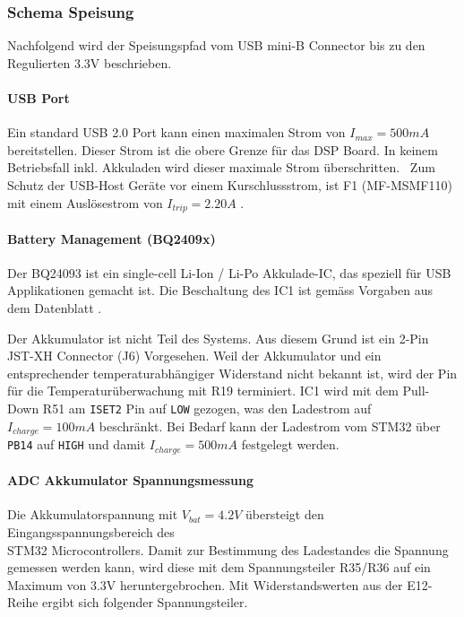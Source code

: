\subsubsection{Schema Speisung}
\label{sec:Schema_Speisung}

Nachfolgend wird der Speisungspfad vom USB mini-B Connector bis zu den Regulierten 3.3\si{V} beschrieben.

\paragraph{USB Port}

Ein standard USB 2.0 Port kann einen maximalen Strom von ${I_{max}=500\si{mA}}$ bereitstellen.
Dieser Strom ist die obere Grenze für das DSP Board. In keinem Betriebsfall inkl. Akkuladen wird dieser maximale Strom überschritten.
\
Zum Schutz der USB-Host Geräte vor einem Kurschlussstrom, ist F1 (MF-MSMF110) mit einem Auslösestrom von ${I_{trip}=2.20\si{A}}$ \cite{usb-fuse}.


\paragraph{Battery Management (BQ2409x)}

Der BQ24093 ist ein single-cell Li-Ion / Li-Po Akkulade-IC, das speziell für USB Applikationen gemacht ist.
Die Beschaltung des IC1 ist gemäss Vorgaben aus dem Datenblatt \cite{bq2409x}.

Der Akkumulator ist nicht Teil des Systems. Aus diesem Grund ist ein 2-Pin JST-XH Connector (J6) Vorgesehen.
Weil der Akkumulator und ein entsprechender temperaturabhängiger Widerstand nicht bekannt ist, 
wird der Pin für die Temperaturüberwachung mit R19 terminiert.
IC1 wird mit dem Pull-Down R51 am \texttt{ISET2} Pin auf \texttt{LOW} gezogen, was den Ladestrom auf ${I_{charge}=100\si{mA}}$ beschränkt. 
Bei Bedarf kann der Ladestrom vom STM32 über \texttt{PB14} auf \texttt{HIGH} und damit ${I_{charge}=500\si{mA}}$ festgelegt werden.



\paragraph{ADC Akkumulator Spannungsmessung}

Die Akkumulatorspannung mit ${V_{bat}=4.2\si{V}}$ übersteigt den Eingangsspannungsbereich des\\
 STM32 Microcontrollers.
Damit zur Bestimmung des Ladestandes die Spannung gemessen werden kann, wird diese mit dem Spannungsteiler R35/R36 auf ein Maximum von 3.3\si{V} heruntergebrochen. 
Mit Widerstandswerten aus der E12-Reihe ergibt sich folgender Spannungsteiler.

